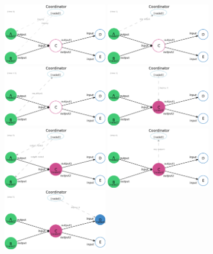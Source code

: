 \begin{figure}[h]\centering
    \includegraphics[width=0.4\textwidth]{figures/incdep_example_1}
    \includegraphics[width=0.4\textwidth]{figures/incdep_example_2}
    \includegraphics[width=0.4\textwidth]{figures/incdep_example_2_5}
    \includegraphics[width=0.4\textwidth]{figures/incdep_example_3}
    \includegraphics[width=0.4\textwidth]{figures/incdep_example_4}
    \includegraphics[width=0.4\textwidth]{figures/incdep_example_5}
    \includegraphics[width=0.4\textwidth]{figures/incdep_example_6}

\end{figure}
